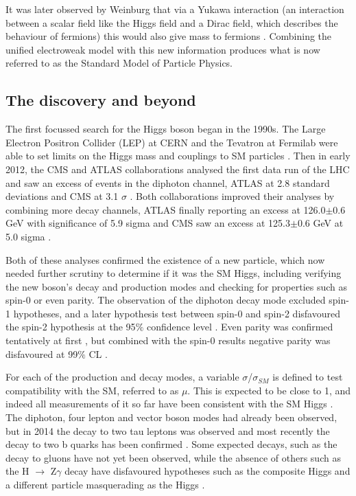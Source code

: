 \documentclass[12pt]{article}
\begin{document}
It was later observed by Weinburg that via a Yukawa interaction (an interaction between a scalar field like the Higgs field and a Dirac field, which describes the behaviour of fermions) this would also give mass to fermions \cite{lepmass}. Combining the unified electroweak model with this new information produces what is now referred to as the Standard Model of Particle Physics. 

\subsection*{The discovery and beyond}
The first focussed search for the Higgs boson began in the 1990s. The Large Electron Positron Collider (LEP) at CERN and the Tevatron at Fermilab were able to set limits on the Higgs mass and couplings to SM particles \cite{limit1} \cite{limit3p5} \cite{limit3}. Then in early 2012, the CMS and ATLAS collaborations analysed the first data run of the LHC and saw an excess of events in the diphoton channel, ATLAS at 2.8 standard deviations \cite{limit6} and CMS at 3.1 $\sigma$ \cite{limit7}. Both collaborations improved their analyses by combining more decay channels, ATLAS finally reporting an excess at 126.0$\pm$0.6 GeV with significance of 5.9 sigma \cite{atlasann} and CMS saw an excess at 125.3$\pm$0.6 GeV at 5.0 sigma \cite{cmsannouncement}. 


Both of these analyses confirmed the existence of a new particle, which now needed further scrutiny to determine if it was the SM Higgs, including verifying the new boson's decay and production modes and checking for properties such as spin-0 or even parity. The observation of the diphoton decay mode excluded spin-1 hypotheses, and a later hypothesis test between spin-0 and spin-2 disfavoured the spin-2 hypothesis at the 95$\%$ confidence level \cite{cmsupdate2}. Even parity was confirmed tentatively at first \cite{parity1}, but combined with the spin-0 results negative parity was disfavoured at 99$\%$ CL \cite{parity2}. 

For each of the production and decay modes, a variable $\sigma$/$\sigma_{SM}$ is defined to test compatibility with the SM, referred to as $\mu$. This is expected to be close to 1, and indeed all measurements of it so far have been consistent with the SM Higgs \cite{atlasann}\cite{cmsupdate2}. The diphoton, four lepton and vector boson modes had already been observed, but in 2014 the decay to two tau leptons was observed \cite{taudecayproof} and most recently the decay to two b quarks has been confirmed \cite{bbdecayproof}. Some expected decays, such as the decay to gluons \cite{gluinotheory2} have not yet been observed, while the absence of others such as the H $\rightarrow$ Z$\gamma$ decay have disfavoured hypotheses such as the composite Higgs \cite{comp} and a different particle masquerading as the Higgs \cite{impostor}.
\end{document}
